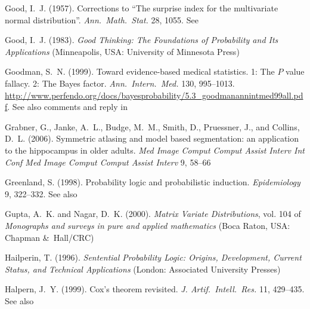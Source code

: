 \documentclass[%
]{frontiersSCNS-nologo} %
\newcommand*{\citebi}[2][]{\citet[#1]{#2}%
}
\newcommand*{\amp}{\&}
\renewcommand*{\|}{\mathpunct{|}}%
\begin{document}
\begin{thebibliography}{156}
Good, I.~J. (1957{}).
\newblock Corrections to ``{The} surprise index for the multivariate normal
  distribution''.
\newblock \emph{Ann.\ Math.\ Stat.} 28, 1055.
\newblock See \citebi{good1956}

Good, I.~J. (1983).
\newblock \emph{Good Thinking: The Foundations of Probability and Its
  Applications} (Minneapolis, USA: University of Minnesota Press)

Goodman, S.~N. (1999).
\newblock Toward evidence-based medical statistics. 1: {The} {$P$} value
  fallacy. 2: {The} {Bayes} factor.
\newblock \emph{Ann.\ Intern.\ Med.} 130, 995--1013.
\newblock
  \url{http://www.perfendo.org/docs/bayesprobability/5.3_goodmanannintmed99all.pdf}.
  See also comments and reply in \citebi{davidoff1999,sulmasyetal2000}

Grabner, G., Janke, A.~L., Budge, M.~M., Smith, D., Pruessner, J., and Collins,
  D.~L. (2006).
\newblock Symmetric atlasing and model based segmentation: an application to
  the hippocampus in older adults.
\newblock \emph{Med Image Comput Comput Assist Interv Int Conf Med Image Comput
  Comput Assist Interv} 9, 58--66

Greenland, S. (1998).
\newblock Probability logic and probabilistic induction.
\newblock \emph{Epidemiology} 9, 322--332.
\newblock See also \citebi{maclure1998}

Gupta, A.~K. and Nagar, D.~K. (2000).
\newblock \emph{Matrix Variate Distributions}, vol. 104 of \emph{Monographs and
  surveys in pure and applied mathematics} (Boca Raton, USA: Chapman \amp\
  Hall/CRC)

Hailperin, T. (1996).
\newblock \emph{Sentential Probability Logic: Origins, Development, Current
  Status, and Technical Applications} (London: Associated University Presses)
\bibAnnoteFile{hailperin1996}

Halpern, J.~Y. (1999).
\newblock Cox's theorem revisited.
\newblock \emph{J. Artif.\ Intell.\ Res.} 11, 429--435.
\newblock See also \citebi{snow1998}


\end{thebibliography}
\end{document}
